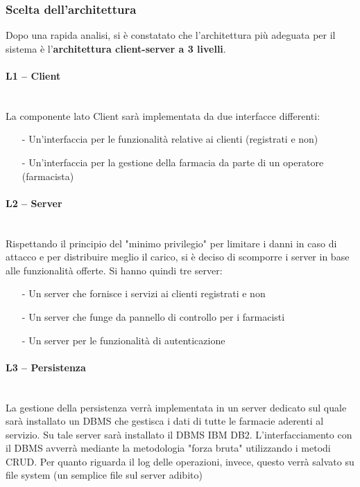 \subsubsection{Scelta dell'architettura}

Dopo una rapida analisi, si è constatato che l'architettura più adeguata per il sistema è l'\textbf{architettura client-server a 3 livelli}.

\paragraph{L1 -- Client}\mbox{}\\
La componente lato Client sarà implementata da due interfacce differenti:

\begin{itemize}
\item[-] Un'interfaccia per le funzionalità relative ai clienti (registrati e non)
\item[-] Un'interfaccia per la gestione della farmacia da parte di un operatore (farmacista)
\end{itemize}

\paragraph{L2 -- Server}\mbox{}\\
Rispettando il principio del "minimo privilegio" per limitare i danni in caso di attacco e per distribuire meglio il carico, si è deciso di scomporre i server in base alle funzionalità offerte. Si hanno quindi tre server:

\begin{itemize}
\item[-] Un server che fornisce i servizi ai clienti registrati e non
\item[-] Un server che funge da pannello di controllo per i farmacisti
\item[-] Un server per le funzionalità di autenticazione
\end{itemize}

\paragraph{L3 -- Persistenza}\mbox{}\\
La gestione della persistenza verrà implementata in un server dedicato sul quale sarà installato un DBMS che gestisca i dati di tutte le farmacie aderenti al servizio.
Su tale server sarà installato il DBMS IBM DB2.
L'interfacciamento con il DBMS avverrà mediante la metodologia "forza bruta" utilizzando i metodi CRUD.
Per quanto riguarda il log delle operazioni, invece, questo verrà salvato su file system (un semplice file sul server adibito)

